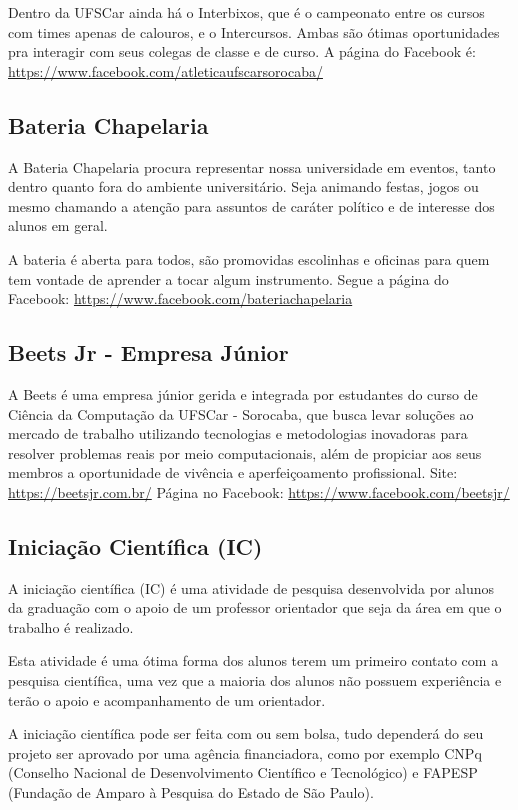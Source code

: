 Dentro da UFSCar ainda há o Interbixos, que é o campeonato entre os cursos com times apenas de calouros, e o Intercursos. Ambas são ótimas oportunidades pra interagir com seus colegas de classe e de curso. A página do Facebook é: \url{https://www.facebook.com/atleticaufscarsorocaba/}

\subsection{Bateria Chapelaria}
A Bateria Chapelaria procura representar nossa universidade em eventos, tanto dentro quanto fora do ambiente universitário. Seja animando festas, jogos ou mesmo chamando a atenção para assuntos de caráter político e de interesse dos alunos em geral.

A bateria é aberta para todos, são promovidas escolinhas e oficinas para quem tem vontade de aprender a tocar algum instrumento. Segue a página do Facebook: \newline \url{https://www.facebook.com/bateriachapelaria}

\subsection{Beets Jr - Empresa Júnior}
A Beets é uma empresa júnior gerida e integrada por estudantes do curso de Ciência da Computação da UFSCar - Sorocaba, que busca levar soluções ao mercado de trabalho utilizando tecnologias e metodologias inovadoras para resolver problemas reais por meio computacionais, além de propiciar aos seus membros a oportunidade de vivência e aperfeiçoamento profissional. \newline Site: \url{https://beetsjr.com.br/} \newline Página no Facebook: \url{https://www.facebook.com/beetsjr/}

\subsection{Iniciação Científica (IC)}
A iniciação científica (IC) é uma atividade de pesquisa desenvolvida por alunos da graduação com o apoio de um professor orientador que seja da área em que o trabalho é realizado.

Esta atividade é uma ótima forma dos alunos terem um primeiro contato com a pesquisa científica, uma vez que a maioria dos alunos não possuem experiência e terão o apoio e acompanhamento de um orientador.

A iniciação científica pode ser feita com ou sem bolsa, tudo dependerá do seu projeto ser aprovado por uma agência financiadora,  como por exemplo CNPq (Conselho Nacional de Desenvolvimento Científico e Tecnológico) e FAPESP (Fundação de Amparo à Pesquisa do Estado de São Paulo). 


